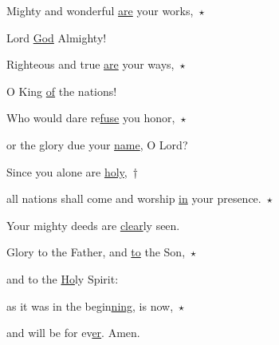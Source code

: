 \noindent Mighty and wonderful \uline{are} your works,~$\star$~\nopagebreak

Lord \uline{God} Almighty!

\noindent Righteous and true \uline{are} your ways,~$\star$~\nopagebreak

O King \uline{of} the nations!

\noindent Who would dare re\uline{fuse} you honor,~$\star$~\nopagebreak

or the glory due your \uline{name}, O Lord?

\noindent Since you alone are \uline{holy},~†~\nopagebreak

all nations shall come and worship \uline{in} your presence.~$\star$~\nopagebreak

Your mighty deeds are \uline{clear}ly seen.

\noindent Glory to the Father, and \uline{to} the Son,~$\star$~\nopagebreak

and to the \uline{Ho}ly Spirit:

\noindent as it was in the begin\uline{ning}, is now,~$\star$~\nopagebreak

and will be for ev\uline{er}. Amen.